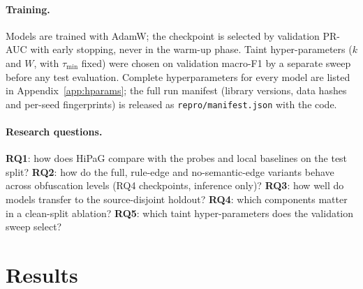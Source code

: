 \documentclass[pdflatex,sn-mathphys-num]{sn-jnl}
\begin{document}
\paragraph{Training.} Models are trained with AdamW; the checkpoint is selected
by validation PR-AUC with early stopping, never in the warm-up phase. Taint
hyper-parameters ($k$ and $W$, with $\tau_{\min}$ fixed) were chosen on
validation macro-F1 by a separate sweep before any test evaluation. Complete
hyperparameters for every model are listed in Appendix~\ref{app:hparams}; the
full run manifest (library versions, data hashes and per-seed fingerprints) is
released as \texttt{repro/manifest.json} with the code.

\paragraph{Research questions.} \textbf{RQ1}: how does HiPaG compare with the
probes and local baselines on the test split? \textbf{RQ2}: how do the full,
rule-edge and no-semantic-edge variants behave across obfuscation levels (RQ4
checkpoints, inference only)? \textbf{RQ3}: how well do models transfer to the
source-disjoint holdout? \textbf{RQ4}: which components matter in a clean-split
ablation? \textbf{RQ5}: which taint hyper-parameters does the validation sweep
select?

\section{Results}\label{sec:results}
\end{document}
